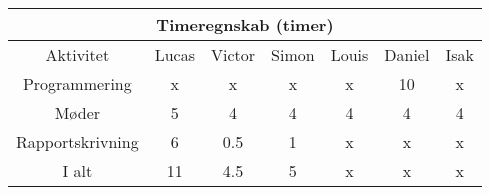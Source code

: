 \centering
\begin{tabular}{ |c|c|c|c|c|c|c|  }
 \hline
 \multicolumn{7}{|c|}{Timeregnskab (timer)} \\
 \hline
 Aktivitet & Lucas & Victor & Simon & Louis & Daniel & Isak\\
 \hline
 
 
 Programmering      & x & x & x & x & 10 & x \\
 
 Møder              & 5 & 4 & 4 & 4 & 4 & 4 \\
 
 Rapportskrivning   & 6 & 0.5 & 1 & x & x & x \\
 
 \hline
 
 I alt              & 11 & 4.5 & 5 & x & x & x \\
 
 
 \hline
\end{tabular}